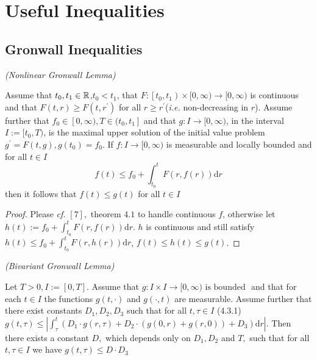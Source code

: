 \chapter{Useful Inequalities}
\label{cha:inequalities}

\section{Gronwall Inequalities}
\label{sec:Gronwall}
\begin{lemma}\textit{(Nonlinear Gronwall Lemma)}

  Assume that $t_{0}, t_{1} \in {\mathbb{R}}$,$ t_{0}<t_{1}$, that $F:\left[t_{0}, t_{1} \right) \times[0, \infty)\rightarrow[0, \infty)$ is continuous and that $F(t, r) \geqslant F\left(t, r^{\prime}\right)$ for all $r \geqslant r^{\prime}$(\textit{i.e.} non-decreasing in $r$). Assume further that $f_{0} \in [0, \infty), T \in (t_{0}, t_{1}]$ and that $g: I \rightarrow [0, \infty)$, in the interval $I:=[t_{0}, T) $, is the maximal upper solution of the initial value problem $g^{\prime}=F(t, g), g\left(t_{0}\right)=f_{0}$. If $f: I \rightarrow[0, \infty)$ is measurable and locally bounded and for all $t \in I$
\[
f(t) \leqslant f_{0}+\int_{t_{0}}^{t} F(r, f(r)) \mathrm{d} r
\]
then it follows that $f(t) \leqslant g(t)$ for all $t \in I$
\end{lemma}

\begin{proof}
  Please \textit{cf.} $[7],$ theorem $4.1$ to handle continuous $f$, otherwise let $h(t):=f_{0}+\int_{t_{0}}^{t} F(r, f(r)) \mathrm{d} r $. $h$ is continuous and still satisfy $h(t) \leqslant f_{0}+\int_{t_{0}}^{t} F(r, h(r)) \mathrm{d} r$, $f(t) \leqslant h(t) \leqslant g(t)$.
\end{proof}


\begin{lemma}\textit{(Bivariant Gronwall Lemma)}
\label{lem:bivariant-Gronwall}

  Let $T>0, I:=[0, T]$. Assume that $g: I \times I \rightarrow[0, \infty) \text { is bounded }$ and that for each $t \in I$ the functions $g(t, \cdot)$ and $g(\cdot, t)$ are measurable. Assume
further that there exist constants $D_{1}, D_{2}, D_{3}$ such that for all $t, \tau \in I$
(4.3.1) $g(t, \tau) \leqslant\left|\int_{\tau}^{t}\left(D_{1} \cdot g(r, \tau)+D_{2} \cdot(g(0, r)+g(r, 0))+D_{3}\right) \mathrm{d} r\right|$.
Then there exists a constant $D,$ which depends only on $D_{1}, D_{2}$ and $T,$ such that
for all $t, \tau \in I$ we have $g(t, \tau) \leqslant D \cdot D_{3}$
\end{lemma}

